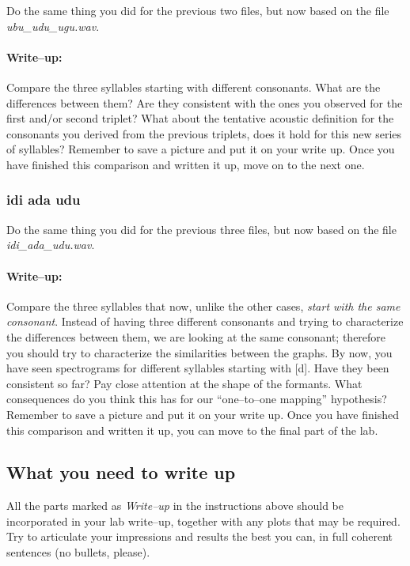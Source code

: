 Do the same thing you did for the previous two files, but now based on the file \emph{ubu\_udu\_ugu.wav}.

\paragraph{Write--up:} Compare the three syllables starting with different consonants. What are the differences between them? Are they consistent with the ones you observed for the first and/or second triplet? What about the tentative acoustic definition for the consonants you derived from the previous triplets, does it hold for this new series of syllables? Remember to save a picture and put it on your write up. Once you have finished this comparison and written it up, move on to the next one.

\subsubsection{idi ada udu}

Do the same thing you did for the previous three files, but now based on the file \emph{idi\_ada\_udu.wav}.

\paragraph{Write--up:} Compare the three syllables that now, unlike the other cases, \emph{start with the same consonant}. Instead of having three different consonants and trying to characterize the differences between them, we are looking at the same consonant; therefore you should try to characterize the similarities between the graphs. By now, you have seen spectrograms for different syllables starting with [d]. Have they been consistent so far? Pay close attention at the shape of the formants. What consequences do you think this has for our ``one--to--one mapping'' hypothesis? Remember to save a picture and put it on your write up. Once you have finished this comparison and written it up, you can move to the final part of the lab.

\subsection{What you need to write up}

All the parts marked as \emph{Write--up} in the instructions above should be incorporated in your lab write--up, together with any plots that may be required. Try to articulate your impressions and results the best you can, in full coherent sentences (no bullets, please).


